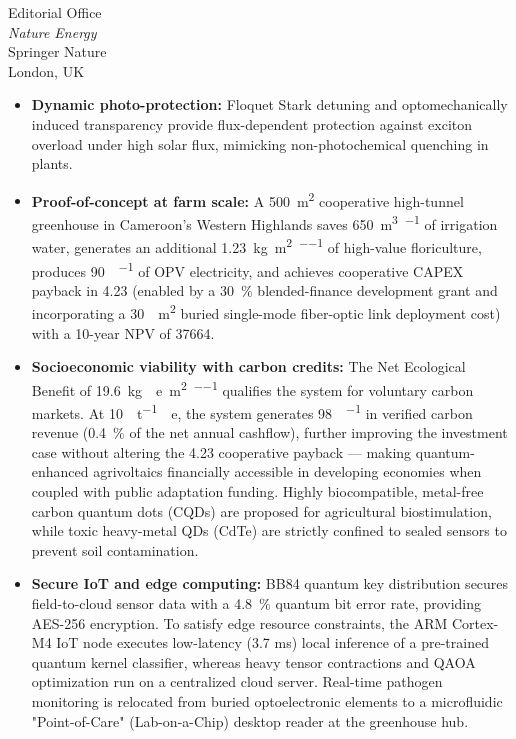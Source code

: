 \documentclass[12pt]{letter}
\begin{document}
\begin{letter}{Editorial Office\\
\textit{Nature Energy}\\
Springer Nature\\
London, UK}
\begin{itemize}
\item \textbf{Dynamic photo-protection:} Floquet Stark detuning and optomechanically induced transparency provide flux-dependent protection against exciton overload under high solar flux, mimicking non-photochemical quenching in plants.

\item \textbf{Proof-of-concept at farm scale:} A \qty{500}{\m\squared} cooperative high-tunnel greenhouse in Cameroon's Western Highlands saves \qty{650}{\m\cubed\per\yr} of irrigation water, generates an additional \qty{1.23}{\kg\per\m\squared\per\yr} of high-value floriculture, produces \qty{90}{\MWh\per\yr} of OPV electricity, and achieves cooperative CAPEX payback in \qty{4.23}{\yr} (enabled by a \qty{30}{\percent} blended-finance development grant and incorporating a \qty{30}{\per\m\squared} buried single-mode fiber-optic link deployment cost) with a 10-year NPV of \qty{+37664}{\USD}.

\item \textbf{Socioeconomic viability with carbon credits:} The Net Ecological Benefit of \qty{19.6}{\kg{}e\per\m\squared\per\yr} qualifies the system for voluntary carbon markets. At \qty{10}{\USD\per\tonne{}e}, the system generates \qty{98}{\USD\per\yr} in verified carbon revenue (\qty{0.4}{\percent} of the net annual cashflow), further improving the investment case without altering the \qty{4.23}{\yr} cooperative payback --- making quantum-enhanced agrivoltaics financially accessible in developing economies when coupled with public adaptation funding. Highly biocompatible, metal-free carbon quantum dots (CQDs) are proposed for agricultural biostimulation, while toxic heavy-metal QDs (CdTe) are strictly confined to sealed sensors to prevent soil contamination.

\item \textbf{Secure IoT and edge computing:} BB84 quantum key distribution secures field-to-cloud sensor data with a \qty{4.8}{\percent} quantum bit error rate, providing AES-256 encryption. To satisfy edge resource constraints, the ARM Cortex-M4 IoT node executes low-latency (3.7 ms) local inference of a pre-trained quantum kernel classifier, whereas heavy tensor contractions and QAOA optimization run on a centralized cloud server. Real-time pathogen monitoring is relocated from buried optoelectronic elements to a microfluidic "Point-of-Care" (Lab-on-a-Chip) desktop reader at the greenhouse hub.
\end{itemize}


\end{letter}
\end{document}
